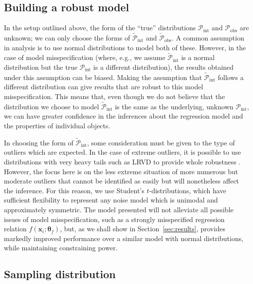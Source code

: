 \documentclass[fleqn,usenatbib]{rasti}
\begin{document}
\subsection{Building a robust model}
\label{sec:formalism.robust}

In the setup outlined above, the form of the ``true'' distributions
$\mathcal{P}_{\text{int}}$ and $\mathcal{P}_{\text{obs}}$ are unknown; we can
only choose the forms of $\tilde{\mathcal{P}}_{\text{int}}$ and
$\tilde{\mathcal{P}}_{\text{obs}}$. A common assumption in analysis is to use
normal distributions to model both of these.  However, in the case of model
misspecification (where, e.g., we assume $\tilde{\mathcal{P}}_{\text{int}}$ is a
normal distribution but the true $\mathcal{P}_{\text{int}}$ is a different
distribution), the results obtained under this assumption can be biased. Making
the assumption that $\tilde{\mathcal{P}}_{\text{int}}$ follows a different
distribution can give results that are robust to this model misspecification.
This means that, even though we do not believe that the distribution we choose
to model $\tilde{\mathcal{P}}_{\text{int}}$ is the same as the underlying,
unknown $\mathcal{P}_{\text{int}}$, we can have greater confidence in the
inferences about the regression model and the properties of individual objects.

In choosing the form of $\tilde{\mathcal{P}}_{\text{int}}$, some consideration
must be given to the type of outliers which are expected. In the case of extreme
outliers, it is possible to use distributions with very heavy tails such as LRVD
to provide whole robustness \citep{Gagnon:2020, Hamura:2022}. However, the focus
here is on the less extreme situation of more numerous but moderate outliers
that cannot be identified as easily but will nonetheless affect the inference.
For this reason, we use Student's $t$-distributions, which have sufficient
flexibility to represent any noise model which is unimodal and approximately
symmetric. The model presented will not alleviate all possible issues of model
misspecification, such as a strongly misspecified regression relation
$f(\mathbf{x}_i; \mathbf{\theta}_f)$, but, as we shall show in
Section~\ref{sec:results}, provides markedly improved performance over a similar
model with normal distributions, while maintaining constraining power.

\subsection{Sampling distribution}
\label{sec:formalism.sampling}
\end{document}
